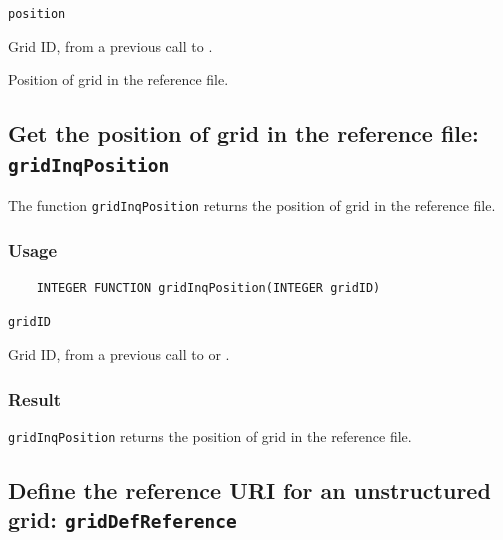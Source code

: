 \hspace*{4mm}\begin{minipage}[]{15cm}
\begin{deflist}{\texttt{position}\ }
\item[\texttt{gridID}]
Grid ID, from a previous call to {}.
\item[\texttt{position}]
Position of grid in the reference file.

\end{deflist}
\end{minipage}


\subsection{Get the position of grid in the reference file: \texttt{gridInqPosition}}
\label{gridInqPosition}

The function {\texttt{gridInqPosition}} returns the position of grid in the reference file.

\subsubsection*{Usage}

\begin{verbatim}
    INTEGER FUNCTION gridInqPosition(INTEGER gridID)
\end{verbatim}

\hspace*{4mm}\begin{minipage}[]{15cm}
\begin{deflist}{\texttt{gridID}\ }
\item[\texttt{gridID}]
Grid ID, from a previous call to {} or {}.

\end{deflist}
\end{minipage}

\subsubsection*{Result}

{\texttt{gridInqPosition}} returns the position of grid in the reference file.


\subsection{Define the reference URI for an unstructured grid: \texttt{gridDefReference}}
\label{gridDefReference}

